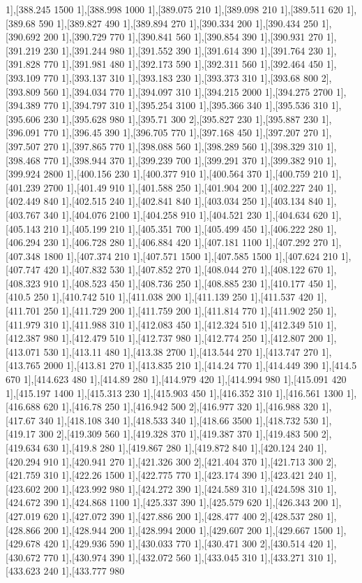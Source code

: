 {1],[388.245 1500 1],[388.998 1000 1],[389.075 210 1],[389.098 210 1],[389.511 620 1],[389.68 590 1],[389.827 490 1],[389.894 270 1],[390.334 200 1],[390.434 250 1],[390.692 200 1],[390.729 770 1],[390.841 560 1],[390.854 390 1],[390.931 270 1],[391.219 230 1],[391.244 980 1],[391.552 390 1],[391.614 390 1],[391.764 230 1],[391.828 770 1],[391.981 480 1],[392.173 590 1],[392.311 560 1],[392.464 450 1],[393.109 770 1],[393.137 310 1],[393.183 230 1],[393.373 310 1],[393.68 800 2],[393.809 560 1],[394.034 770 1],[394.097 310 1],[394.215 2000 1],[394.275 2700 1],[394.389 770 1],[394.797 310 1],[395.254 3100 1],[395.366 340 1],[395.536 310 1],[395.606 230 1],[395.628 980 1],[395.71 300 2],[395.827 230 1],[395.887 230 1],[396.091 770 1],[396.45 390 1],[396.705 770 1],[397.168 450 1],[397.207 270 1],[397.507 270 1],[397.865 770 1],[398.088 560 1],[398.289 560 1],[398.329 310 1],[398.468 770 1],[398.944 370 1],[399.239 700 1],[399.291 370 1],[399.382 910 1],[399.924 2800 1],[400.156 230 1],[400.377 910 1],[400.564 370 1],[400.759 210 1],[401.239 2700 1],[401.49 910 1],[401.588 250 1],[401.904 200 1],[402.227 240 1],[402.449 840 1],[402.515 240 1],[402.841 840 1],[403.034 250 1],[403.134 840 1],[403.767 340 1],[404.076 2100 1],[404.258 910 1],[404.521 230 1],[404.634 620 1],[405.143 210 1],[405.199 210 1],[405.351 700 1],[405.499 450 1],[406.222 280 1],[406.294 230 1],[406.728 280 1],[406.884 420 1],[407.181 1100 1],[407.292 270 1],[407.348 1800 1],[407.374 210 1],[407.571 1500 1],[407.585 1500 1],[407.624 210 1],[407.747 420 1],[407.832 530 1],[407.852 270 1],[408.044 270 1],[408.122 670 1],[408.323 910 1],[408.523 450 1],[408.736 250 1],[408.885 230 1],[410.177 450 1],[410.5 250 1],[410.742 510 1],[411.038 200 1],[411.139 250 1],[411.537 420 1],[411.701 250 1],[411.729 200 1],[411.759 200 1],[411.814 770 1],[411.902 250 1],[411.979 310 1],[411.988 310 1],[412.083 450 1],[412.324 510 1],[412.349 510 1],[412.387 980 1],[412.479 510 1],[412.737 980 1],[412.774 250 1],[412.807 200 1],[413.071 530 1],[413.11 480 1],[413.38 2700 1],[413.544 270 1],[413.747 270 1],[413.765 2000 1],[413.81 270 1],[413.835 210 1],[414.24 770 1],[414.449 390 1],[414.5 670 1],[414.623 480 1],[414.89 280 1],[414.979 420 1],[414.994 980 1],[415.091 420 1],[415.197 1400 1],[415.313 230 1],[415.903 450 1],[416.352 310 1],[416.561 1300 1],[416.688 620 1],[416.78 250 1],[416.942 500 2],[416.977 320 1],[416.988 320 1],[417.67 340 1],[418.108 340 1],[418.533 340 1],[418.66 3500 1],[418.732 530 1],[419.17 300 2],[419.309 560 1],[419.328 370 1],[419.387 370 1],[419.483 500 2],[419.634 630 1],[419.8 280 1],[419.867 280 1],[419.872 840 1],[420.124 240 1],[420.294 910 1],[420.941 270 1],[421.326 300 2],[421.404 370 1],[421.713 300 2],[421.759 310 1],[422.26 1500 1],[422.775 770 1],[423.174 390 1],[423.421 240 1],[423.602 200 1],[423.992 980 1],[424.272 390 1],[424.589 310 1],[424.598 310 1],[424.672 390 1],[424.868 1100 1],[425.337 390 1],[425.579 620 1],[426.343 200 1],[427.019 620 1],[427.072 390 1],[427.886 200 1],[428.477 400 2],[428.537 280 1],[428.866 200 1],[428.944 200 1],[428.994 2000 1],[429.607 200 1],[429.667 1500 1],[429.678 420 1],[429.936 590 1],[430.033 770 1],[430.471 300 2],[430.514 420 1],[430.672 770 1],[430.974 390 1],[432.072 560 1],[433.045 310 1],[433.271 310 1],[433.623 240 1],[433.777 980 }
